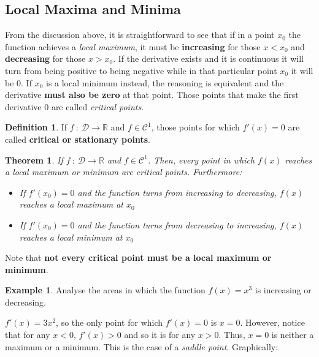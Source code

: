 \documentclass[11pt]{article}
\theoremstyle{definition}
\newtheorem{definition}{Definition}
\newtheorem{example}{Example}
\theoremstyle{plain}
\newtheorem{theorem}{Theorem}
\begin{document}
\subsection{Local Maxima and Minima}\label{local-maxima-and-minima}

From the discussion above, it is straightforward to see that if in a
point \(x_0\) the function achieves a \emph{local maximum}, it must be
\textbf{increasing} for those \(x < x_0\) and \textbf{decreasing} for
those \(x > x_0\). If the derivative exists and it is continuous it will
turn from being positive to being negative while in that particular
point \(x_0\) it will be \(0\). If \(x_0\) is a local minimum instead,
the reasoning is equivalent and the derivative \textbf{must also be
zero} at that point. Those points that make the first derivative \(0\)
are called \emph{critical points}.

\begin{definition}
If \(f \ : \ \mathcal{D}\rightarrow\mathbb{R}\) and
\(f\in\mathcal{C}^1\), those points for which \(f'(x) = 0\) are called
\textbf{critical or stationary points}.
\end{definition}

\begin{theorem}
If \(f \ : \ \mathcal{D}\rightarrow\mathbb{R}\) and
\(f\in\mathcal{C}^1\). Then, every point in which \(f(x)\) reaches a
local maximum or minimum are critical points. Furthermore:

\begin{itemize}
    \item If \(f'(x_0) = 0\) and the function turns from increasing to decreasing,
\(f(x)\) reaches a local maximum at \(x_0\) 

    \item If \(f'(x_0) = 0\) and the function turns from decreasing to increasing, \(f(x)\) reaches a local minimum at \(x_0\)
\end{itemize}
\end{theorem}

Note that \textbf{not every critical point must be a local maximum or
minimum}.

\begin{example}
Analyse the areas in which the function \(f(x) = x^3\)
is increasing or decreasing.

\(f'(x) = 3x^2\), so the only point for which \(f'(x) = 0\) is
\(x = 0\). However, notice that for any \(x < 0\), \(f'(x) > 0\) and so
it is for any \(x > 0\). Thus, \(x = 0\) is neither a maximum or a
minimum. This is the case of a \emph{saddle point}. Graphically:
\end{example}
\end{document}
